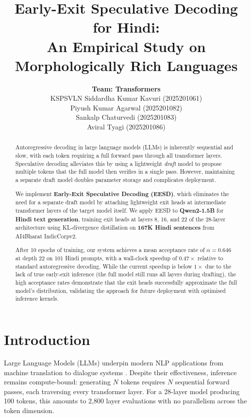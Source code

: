 \documentclass[11pt]{article}
\title{Early-Exit Speculative Decoding for Hindi: \\
An Empirical Study on Morphologically Rich Languages}
\author{
\textbf{Team: Transformers} \\
KSPSVLN Siddardha Kumar Kavuri (2025201061) \\
Piyush Kumar Agarwal (2025201082) \\
Sankalp Chaturvedi (2025201083) \\
Aviral Tyagi (2025201086)
}
\date{}
\begin{document}
\maketitle

\begin{abstract}
Autoregressive decoding in large language models (LLMs) is inherently sequential and slow, with each token requiring a full forward pass through all transformer layers.  Speculative decoding alleviates this by using a lightweight \emph{draft} model to propose multiple tokens that the full model then verifies in a single pass.  However, maintaining a separate draft model doubles parameter storage and complicates deployment.

We implement \textbf{Early-Exit Speculative Decoding (EESD)}, which eliminates the need for a separate draft model by attaching lightweight exit heads at intermediate transformer layers of the target model itself.  We apply EESD to \textbf{Qwen2-1.5B} for \textbf{Hindi text generation}, training exit heads at layers 8, 16, and 22 of the 28-layer architecture using KL-divergence distillation on \textbf{167K Hindi sentences} from AI4Bharat IndicCorpv2.

After 10 epochs of training, our system achieves a mean acceptance rate of $\alpha = 0.646$ at depth 22 on 101 Hindi prompts, with a wall-clock speedup of $0.47\times$ relative to standard autoregressive decoding.  While the current speedup is below $1\times$ due to the lack of true early-exit inference (the full model still runs all layers during drafting), the high acceptance rates demonstrate that the exit heads successfully approximate the full model's distribution, validating the approach for future deployment with optimised inference kernels.
\end{abstract}

\section{Introduction}
\label{sec:intro}

Large Language Models (LLMs) underpin modern NLP applications from machine translation to dialogue systems \cite{zhou2024survey}.  Despite their effectiveness, inference remains compute-bound: generating $N$ tokens requires $N$ sequential forward passes, each traversing every transformer layer.  For a 28-layer model producing 100 tokens, this amounts to 2,800 layer evaluations with no parallelism across the token dimension.
\end{document}
